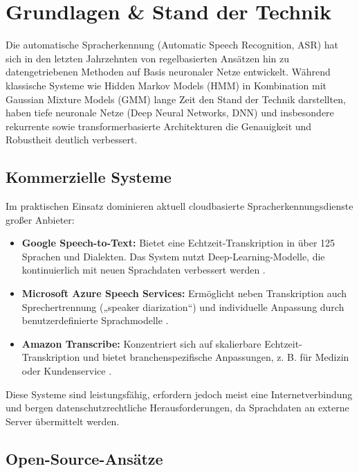 \chapter{Grundlagen \& Stand der Technik}

Die automatische Spracherkennung (Automatic Speech Recognition, ASR) hat sich in den letzten Jahrzehnten von regelbasierten Ansätzen hin zu datengetriebenen Methoden auf Basis neuronaler Netze entwickelt. Während klassische Systeme wie Hidden Markov Models (HMM) in Kombination mit Gaussian Mixture Models (GMM) lange Zeit den Stand der Technik darstellten, haben tiefe neuronale Netze (Deep Neural Networks, DNN) und insbesondere rekurrente sowie transformerbasierte Architekturen die Genauigkeit und Robustheit deutlich verbessert.

\section{Kommerzielle Systeme}

Im praktischen Einsatz dominieren aktuell cloudbasierte Spracherkennungsdienste großer Anbieter:

\begin{itemize}
\item \textbf{Google Speech-to-Text:} Bietet eine Echtzeit-Transkription in über 125 Sprachen und Dialekten. Das System nutzt Deep-Learning-Modelle, die kontinuierlich mit neuen Sprachdaten verbessert werden \cite{google_cloud_2025}.

\item \textbf{Microsoft Azure Speech Services:} Ermöglicht neben Transkription auch Sprechertrennung („speaker diarization“) und individuelle Anpassung durch benutzerdefinierte Sprachmodelle \cite{microsoft_2025}.

\item \textbf{Amazon Transcribe:} Konzentriert sich auf skalierbare Echtzeit-Transkription und bietet branchenspezifische Anpassungen, z. B. für Medizin oder Kundenservice \cite{aws_2025}.
\end{itemize}
Diese Systeme sind leistungsfähig, erfordern jedoch meist eine Internetverbindung und bergen datenschutzrechtliche Herausforderungen, da Sprachdaten an externe Server übermittelt werden.

\section{Open-Source-Ansätze}

